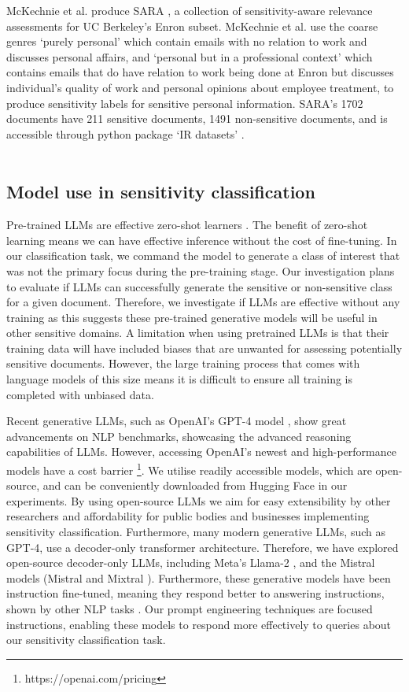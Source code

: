 McKechnie et al. produce SARA \cite{mckechnie2024sara}, a collection of sensitivity-aware relevance assessments for UC Berkeley’s Enron subset. McKechnie et al. use the coarse genres `purely personal' which contain emails with no relation to work and discusses personal affairs, and `personal but in a professional context' which contains emails that do have relation to work being done at Enron but discusses individual’s quality of work and personal opinions about employee treatment, to produce sensitivity labels for sensitive personal information. SARA’s 1702 documents have 211 sensitive documents, 1491 non-sensitive documents, and is accessible through python package `IR datasets' \cite{macavaney2021simplified}. \\\\

\subsection{Model use in sensitivity classification}
Pre-trained LLMs are effective zero-shot learners \cite{kojima2022large}. The benefit of zero-shot learning means we can have effective inference without the cost of fine-tuning. In our classification task, we command the model to generate a class of interest that was not the primary focus during the pre-training stage. Our investigation plans to evaluate if LLMs can successfully generate the sensitive or non-sensitive class for a given document. Therefore, we investigate if LLMs are effective without any training as this suggests these pre-trained generative models will be useful in other sensitive domains. A limitation when using pretrained LLMs is that their training data will have included biases that are unwanted for assessing potentially sensitive documents. However, the large training process that comes with language models of this size means it is difficult to ensure all training is completed with unbiased data.

Recent generative LLMs, such as OpenAI’s GPT-4 model \cite{openai2023gpt}, show great advancements on NLP benchmarks, showcasing the advanced reasoning capabilities of LLMs. However, accessing OpenAI’s newest and high-performance models have a cost barrier \footnote{https://openai.com/pricing}. We utilise readily accessible models, which are open-source, and can be conveniently downloaded from Hugging Face \cite{wolf-etal-2020-transformers} in our experiments. By using open-source LLMs we aim for easy extensibility by other researchers and affordability for public bodies and businesses implementing sensitivity classification. Furthermore, many modern generative LLMs, such as GPT-4, use a decoder-only transformer architecture. Therefore, we have explored open-source decoder-only LLMs, including Meta’s Llama-2 \cite{touvron2023llama}, and the Mistral models (Mistral \cite{jiang2023mistral} and Mixtral \cite{jiang2024mixtral}). Furthermore, these generative models have been instruction fine-tuned, meaning they respond better to answering instructions, shown by other NLP tasks \cite{wei2021finetuned}. Our prompt engineering techniques are focused instructions, enabling these models to respond more effectively to queries about our sensitivity classification task.

